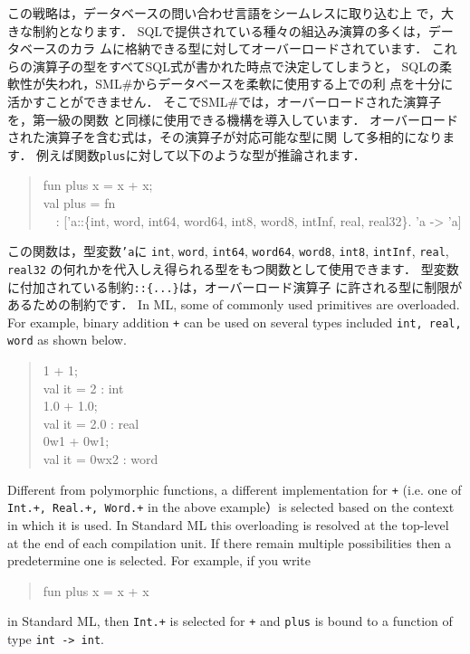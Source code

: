 \documentclass{jbook}
\newcommand{\smlsharp}{SML\#}
\newcommand{\myem}{\mbox{\ \ }}
\begin{document}
	この戦略は，データベースの問い合わせ言語をシームレスに取り込む上
で，大きな制約となります．
	SQLで提供されている種々の組込み演算の多くは，データベースのカラ
ムに格納できる型に対してオーバーロードされています．
	これらの演算子の型をすべてSQL式が書かれた時点で決定してしまうと，
SQLの柔軟性が失われ，\smlsharp{}からデータベースを柔軟に使用する上での利
点を十分に活かすことができません．
	そこで\smlsharp{}では，オーバーロードされた演算子を，第一級の関数
と同様に使用できる機構を導入しています．
	オーバーロードされた演算子を含む式は，その演算子が対応可能な型に関
して多相的になります．
	例えば関数{\tt plus}に対して以下のような型が推論されます．
\begin{tt}
\begin{quote}
fun plus x = x + x;\\
val plus = fn\\
\myem  : ['a::\{int, word, int64, word64, int8, word8, intInf, real, real32\}. 'a -> 'a]
\end{quote}
\end{tt}
この関数は，型変数{\tt 'a}に
{\tt int}, 
{\tt word}, 
{\tt int64},
{\tt word64},
{\tt word8},
{\tt int8},
{\tt intInf},
{\tt real},
{\tt real32}
の何れかを代入しえ得られる型をもつ関数として使用できます．
	型変数に付加されている制約{\tt ::\{...\}}は，オーバーロード演算子
に許される型に制限があるための制約です．
\else%
	In ML, some of commonly used primitives are overloaded.
	For example, binary addition {\tt +} can be used on several
types included {\tt int, real, word} as shown below.
\begin{tt}
\begin{quote}
1 + 1;\\
val it = 2 : int\\
1.0 + 1.0;\\
val it = 2.0 : real\\
0w1 + 0w1;\\
val it = 0wx2 : word
\end{quote}
\end{tt}
	Different from polymorphic functions, a different implementation
for {\tt +} (i.e. one of {\tt Int.+, Real.+, Word.+} in the above
example）is selected based on the context in which it is used. 
	In Standard ML this overloading is resolved at the top-level
at the end of each compilation unit.
	If there remain multiple possibilities then a predetermine one
is selected.
	For example, if you write 
\begin{tt}
\begin{quote}
fun plus x = x + x
\end{quote}
\end{tt}
in Standard ML, then {\tt Int.+}  is selected for {\tt +} and {\tt plus}
is bound to a function of type {\tt int -> int}.
	
\end{document}
